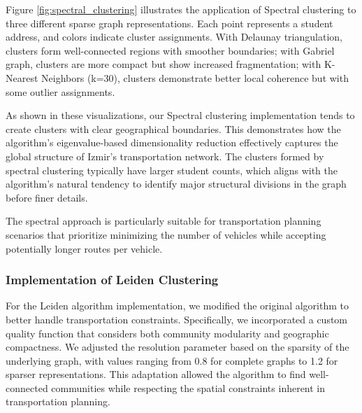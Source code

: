 Figure \ref{fig:spectral_clustering} illustrates the application of Spectral clustering to three different sparse graph representations. Each point represents a student address, and colors indicate cluster assignments. With Delaunay triangulation, clusters form well-connected regions with smoother boundaries; with Gabriel graph, clusters are more compact but show increased fragmentation; with K-Nearest Neighbors (k=30), clusters demonstrate better local coherence but with some outlier assignments.

As shown in these visualizations, our Spectral clustering implementation tends to create clusters with clear geographical boundaries. This demonstrates how the algorithm's eigenvalue-based dimensionality reduction effectively captures the global structure of Izmir's transportation network. The clusters formed by spectral clustering typically have larger student counts, which aligns with the algorithm's natural tendency to identify major structural divisions in the graph before finer details.

The spectral approach is particularly suitable for transportation planning scenarios that prioritize minimizing the number of vehicles while accepting potentially longer routes per vehicle.

\subsubsection{Implementation of Leiden Clustering}
\label{subsubsec:leiden_implementation}

For the Leiden algorithm implementation, we modified the original algorithm to better handle transportation constraints. Specifically, we incorporated a custom quality function that considers both community modularity and geographic compactness. We adjusted the resolution parameter based on the sparsity of the underlying graph, with values ranging from 0.8 for complete graphs to 1.2 for sparser representations. This adaptation allowed the algorithm to find well-connected communities while respecting the spatial constraints inherent in transportation planning.

